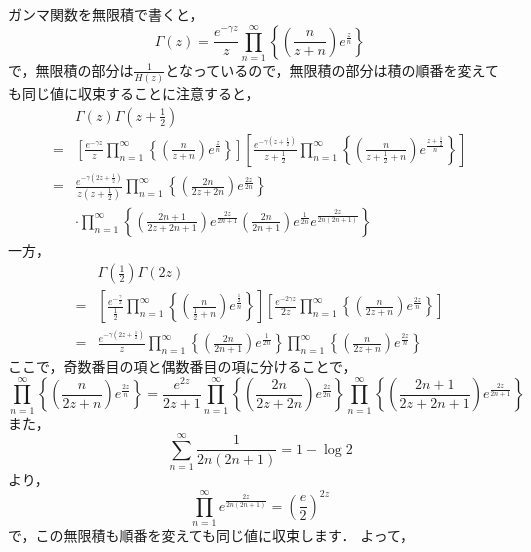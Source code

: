 \documentclass[./main]{subfile}
\begin{document}
ガンマ関数を無限積で書くと，
\[
\Gamma(z)=\frac{e^{-\gamma z}}{z}\prod_{n=1}^{\infty}\left\{\left(\frac{n}{z+n}\right)e^{\frac{z}{n}}\right\}
\]
で，無限積の部分は$\frac{1}{H(z)}$となっているので，無限積の部分は積の順番を変えても同じ値に収束することに注意すると，
\begin{align*}
&\Gamma(z)\Gamma\left(z+\frac{1}{2}\right)\\
=&\left[\frac{e^{-\gamma z}}{z}\prod_{n=1}^{\infty}\left\{\left(\frac{n}{z+n}\right)e^{\frac{z}{n}}\right\}\right]\left[\frac{e^{-\gamma \left(z+\frac{1}{2}\right)}}{z+\frac{1}{2}}\prod_{n=1}^{\infty}\left\{\left(\frac{n}{z+\frac{1}{2}+n}\right)e^{\frac{z+\frac{1}{2}}{n}}\right\}\right]\\
=&\frac{e^{-\gamma \left(2z+\frac{1}{2}\right)}}{z\left(z+\frac{1}{2}\right)}\prod_{n=1}^{\infty}\left\{\left(\frac{2n}{2z+2n}\right)e^{\frac{2z}{2n}}\right\}\\
&\cdot\prod_{n=1}^{\infty}\left\{\left(\frac{2n+1}{2z+2n+1}\right)e^{\frac{2z}{2n+1}}\left(\frac{2n}{2n+1}\right)e^{\frac{1}{2n}}e^{\frac{2z}{2n(2n+1)}}\right\}
\end{align*}
一方，
\begin{align*}
&\Gamma\left(\frac{1}{2}\right)\Gamma(2z)\\
=&\left[\frac{e^{-\frac{\gamma}{2}}}{\frac{1}{2}}\prod_{n=1}^{\infty}\left\{\left(\frac{n}{\frac{1}{2}+n}\right)e^{\frac{\frac{1}{2}}{n}}\right\}\right]\left[\frac{e^{-2\gamma z}}{2z}\prod_{n=1}^{\infty}\left\{\left(\frac{n}{2z+n}\right)e^{\frac{2z}{n}}\right\}\right]\\
=&\frac{e^{-\gamma \left(2z+\frac{1}{2}\right)}}{z}\prod_{n=1}^{\infty}\left\{\left(\frac{2n}{2n+1}\right)e^{\frac{1}{2n}}\right\}\prod_{n=1}^{\infty}\left\{\left(\frac{n}{2z+n}\right)e^{\frac{2z}{n}}\right\}
\end{align*}
ここで，奇数番目の項と偶数番目の項に分けることで，
\[
\prod_{n=1}^{\infty}\left\{\left(\frac{n}{2z+n}\right)e^{\frac{2z}{n}}\right\}=\frac{e^{2z}}{2z+1}\prod_{n=1}^{\infty}\left\{\left(\frac{2n}{2z+2n}\right)e^{\frac{2z}{2n}}\right\}\prod_{n=1}^{\infty}\left\{\left(\frac{2n+1}{2z+2n+1}\right)e^{\frac{2z}{2n+1}}\right\}
\]
また，
\[
\sum_{n=1}^{\infty}\frac{1}{2n(2n+1)}=1-\log 2
\]
より，
\[
\prod_{n=1}^{\infty}e^{\frac{2z}{2n(2n+1)}}=\left(\frac{e}{2}\right)^{2z}
\]
で，この無限積も順番を変えても同じ値に収束します．
よって，
\end{document}
